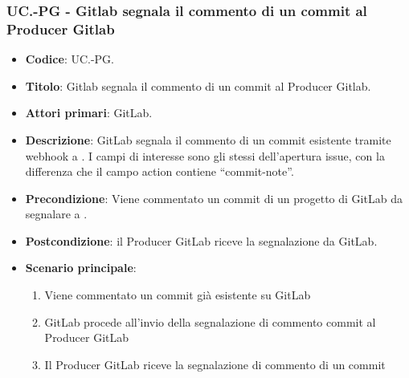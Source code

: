 \subsubsection{UC\theuccount.\thesubuccount-PG - Gitlab segnala il commento di un commit al Producer Gitlab}
\begin{itemize}
    \item \textbf{Codice}: UC\theuccount.\thesubuccount-PG.
    \item \textbf{Titolo}: Gitlab segnala il commento di un commit al Producer Gitlab.
    \item \textbf{Attori primari}: GitLab.
    \item \textbf{Descrizione}: GitLab segnala il commento di un commit esistente tramite webhook a \progetto.
    I campi di interesse sono gli stessi dell'apertura issue, con la differenza che il campo action contiene ``commit-note''.
    \item \textbf{Precondizione}: Viene commentato un commit di un progetto di GitLab da segnalare a \progetto.
    \item \textbf{Postcondizione}: il Producer GitLab riceve la segnalazione da GitLab.
    \item \textbf{Scenario principale}: 
    \begin{enumerate}
        \item Viene commentato un commit già esistente su GitLab
        \item GitLab procede all'invio della segnalazione di commento commit al Producer GitLab
        \item Il Producer GitLab riceve la segnalazione di commento di un commit
    \end{enumerate}
    
\end{itemize}

